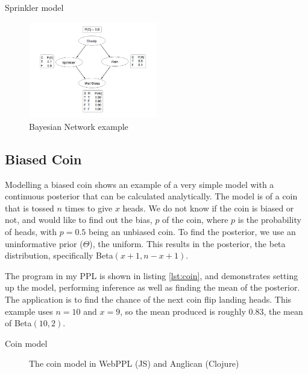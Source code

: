 \begin{listing}[!ht]
	\caption{Sprinkler model}
	\label{lst:sprinkler}
\end{listing}

\begin{figure}[!htb]
	\centering
	\includegraphics[width=0.5\textwidth]{figs/sprinkler-network.png}
	\caption{Bayesian Network example}
	\label{fig:sprinkler-network}
\end{figure}

\subsection{Biased Coin} \label{sec:coin} 
Modelling a biased coin shows an example of a very simple model with a continuous posterior that can be calculated analytically\cite{datasci}. 
% 
The model is of a coin that is tossed $n$ times to give $x$ heads. We do not know if the coin is biased or not, and would like to find out the bias, $p$ of the coin, where $p$ is the probability of heads, with $p=0.5$ being an unbiased coin.
% 
To find the posterior, we use an uninformative prior ($\Theta$), the uniform. This results in the posterior, the beta distribution, specifically Beta$(x+1,n-x+1)$.

The program in my PPL is shown in listing \ref{lst:coin}, and demonstrates setting up the model, performing inference as well as finding the mean of the posterior. The application is to find the chance of the next coin flip landing heads. This example uses $n=10$ and $x=9$, so the mean produced is roughly 0.83, the mean of Beta$(10,2)$.

\begin{listing}[!ht]
	\caption{Coin model}
	\label{lst:coin}
\end{listing}

\begin{figure}[!htb]
	\begin{minipage}{0.5\textwidth}
		\centering
	\end{minipage}
	\begin{minipage}{0.5\textwidth}
		\centering
	\end{minipage}
	\caption{The coin model in WebPPL (JS) and Anglican (Clojure)}
	\label{fig:compare-coin}
\end{figure}

